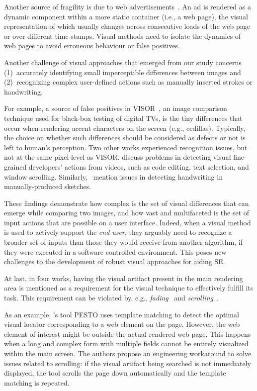 Another source of fragility is due to web advertisements~\cite{Wan-2017-STVR}.
An ad is rendered as a dynamic component within a more static container (i.e., a web page),
the visual representation of which usually changes across consecutive loads of the web page or over different time stamps.
Visual methods need to isolate the dynamics of web pages to avoid erroneous behaviour or false positives.  

Another challenge of visual approaches that emerged from our study concerns (1)~accurately identifying small imperceptible differences between images and (2)~recognizing complex user-defined actions such as manually inserted strokes or handwriting. 

For example, a source of false positives in \textsc{VISOR}~\cite{Kirac-2018-JSS}, an image comparison technique used for black-box testing of digital TVs, is the tiny differences that occur when rendering accent characters on the screen (e.g., cedillas). 
Typically, the choice on whether such differences should be considered as defects or not is left to human's perception. 
%
Two other works experienced recognition issues, but not at the same pixel-level as \textsc{VISOR}. \citet{Bao-2017-EMSE} discuss problems in detecting visual fine-grained developers' actions from videos, such as code editing, text selection, and window scrolling. Similarly,~\citet{Scharf-2013-ICSE} mention issues in detecting handwriting in manually-produced sketches. 

These findings demonstrate how complex is the set of visual differences that can emerge while comparing two images, and how vast and multifaceted is the set of input actions that are possible on a user interface. Indeed, when a visual method is used to actively support the \emph{end user}, they arguably need to recognize a broader set of inputs than those they would receive from another algorithm, if they were executed in a software controlled environment. This poses new challenges to the development of robust visual approaches for aiding SE.


At last, in four works, having the visual artifact present in the main rendering area is mentioned as a requirement for the visual technique to effectively fulfill its task.
This requirement can be violated by, e.g., \textit{fading}~\cite{Chang-2010-CHI,Leotta-2018-STVR} and \textit{scrolling}~\cite{Choudhary-2010-ICSM,Bao-2017-EMSE}.

As an example, \citet{Leotta-2018-STVR}'s tool \textsc{PESTO} uses template matching to detect the optimal visual locator corresponding to a web element on the page. However, the web element of interest might be outside the actual rendered web page. This happens when a long and complex form with multiple fields cannot be entirely visualized within the main screen. The authors propose an engineering workaround to solve issues related to scrolling: if the visual artifact being searched is not immediately displayed, the tool scrolls the page down automatically and the template matching is repeated.


